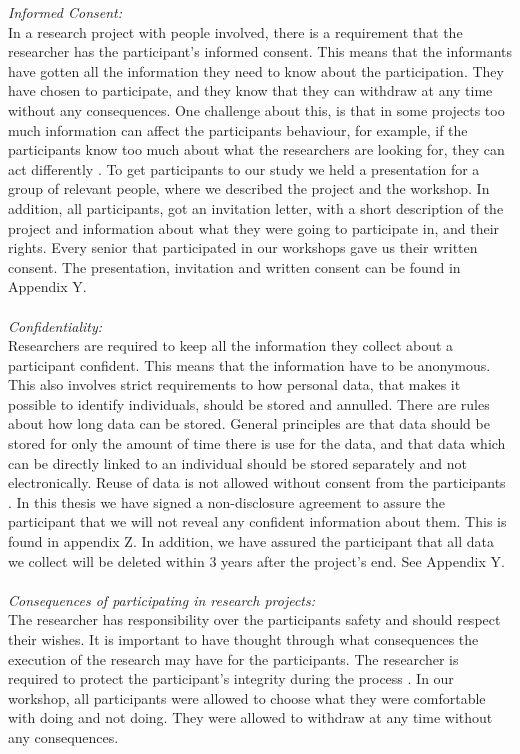 \emph{Informed Consent:} \\
In a research project with people involved, there is a requirement that the researcher has the participant's informed consent. This means that the informants have gotten all the information they need to know about the participation. They have chosen to participate, and they know that they can withdraw at any time without any consequences. One challenge about this, is that in some projects too much information can affect the participants behaviour, for example, if the participants know too much about what the researchers are looking for, they can act differently \cite{qualitative}. To get participants to our study we held a presentation for a group of relevant people, where we described the project and the workshop. In addition, all participants, got an invitation letter, with a short description of the project and information about what they were going to participate in, and their rights. Every senior that participated in our workshops gave us their written consent. The presentation, invitation and written consent can be found in Appendix Y.   \\ \\
\emph{Confidentiality:}\\
Researchers are required to keep all the information they collect about a participant confident. This means that the information have to be anonymous. This also involves strict requirements to how personal data, that makes it possible to identify individuals, should be stored and annulled. There are rules about how long data can be stored. General principles are that data should be stored for only the amount of time there is use for the data, and that data which can be directly linked to an individual should be stored separately and not electronically.  Reuse of data is not allowed without consent from the participants \cite{qualitative}. In this thesis we have signed a non-disclosure agreement to assure the participant that we will not reveal any confident information about them. This is found in appendix Z. In addition, we have assured the participant that all data we collect will be deleted within 3 years after the project's end. See Appendix Y. \\ \\
\emph{Consequences of participating in research projects:}\\
The researcher has responsibility over the participants safety and should respect their wishes. It is important to have thought through what consequences the execution of the research may have for the participants. The researcher is required to protect the participant's integrity during the process \cite{qualitative}. In our workshop, all participants were allowed to choose what they were comfortable with doing and not doing. They were allowed to withdraw at any time without any consequences.  \\ \\

